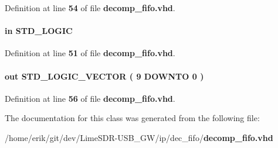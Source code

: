 Definition at line {\bf 54} of file {\bf decomp\+\_\+fifo.\+vhd}.

\paragraph[{wrreq}]{ {\bfseries \textcolor{keywordflow}{in}\textcolor{vhdlchar}{ }} {\bfseries \textcolor{comment}{S\+T\+D\+\_\+\+L\+O\+G\+IC}\textcolor{vhdlchar}{ }} \hspace{0.3cm}{\ttfamily [Port]}}\label{classdecomp__fifo_ae7e02414aa516307988efa17ff21d58c}


Definition at line {\bf 51} of file {\bf decomp\+\_\+fifo.\+vhd}.

\paragraph[{wrusedw}]{ {\bfseries \textcolor{keywordflow}{out}\textcolor{vhdlchar}{ }} {\bfseries \textcolor{comment}{S\+T\+D\+\_\+\+L\+O\+G\+I\+C\+\_\+\+V\+E\+C\+T\+OR}\textcolor{vhdlchar}{ }\textcolor{vhdlchar}{(}\textcolor{vhdlchar}{ }\textcolor{vhdlchar}{ } \textcolor{vhdldigit}{9} \textcolor{vhdlchar}{ }\textcolor{keywordflow}{D\+O\+W\+N\+TO}\textcolor{vhdlchar}{ }\textcolor{vhdlchar}{ } \textcolor{vhdldigit}{0} \textcolor{vhdlchar}{ }\textcolor{vhdlchar}{)}\textcolor{vhdlchar}{ }} \hspace{0.3cm}{\ttfamily [Port]}}\label{classdecomp__fifo_a9b5b441be98457339540d04f85bb4100}


Definition at line {\bf 56} of file {\bf decomp\+\_\+fifo.\+vhd}.



The documentation for this class was generated from the following file\+:\begin{DoxyCompactItemize}
\item 
/home/erik/git/dev/\+Lime\+S\+D\+R-\/\+U\+S\+B\+\_\+\+G\+W/ip/dec\+\_\+fifo/{\bf decomp\+\_\+fifo.\+vhd}\end{DoxyCompactItemize}

